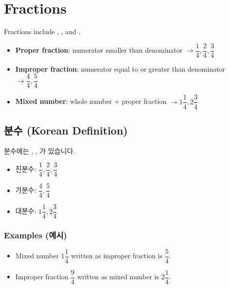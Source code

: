 \documentclass[12pt]{book}
\begin{document}
  \section{Fractions}
  
  Fractions include , , and .  
  
  \begin{itemize}
    \item \textbf{Proper fraction}: numerator smaller than denominator  
      $\rightarrow \dfrac{1}{4}, \dfrac{2}{4}, \dfrac{3}{4}$
    \item \textbf{Improper fraction}: numerator equal to or greater than denominator  
      $\rightarrow \dfrac{4}{4}, \dfrac{5}{4}$
    \item \textbf{Mixed number}: whole number + proper fraction  
      $\rightarrow 1 \dfrac{1}{4}, 2 \dfrac{3}{4}$
  \end{itemize}
  
  \subsection*{분수 (Korean Definition)}
  분수에는 , , 가 있습니다.  
  

  
  \begin{itemize}
    \item 진분수: $\dfrac{1}{4}, \dfrac{2}{4}, \dfrac{3}{4}$
    \item 가분수: $\dfrac{4}{4}, \dfrac{5}{4}$
    \item 대분수: $1 \dfrac{1}{4}, 2 \dfrac{3}{4}$
  \end{itemize}
  
  \subsubsection*{Examples (예시)}
  \begin{itemize}
    \item Mixed number $1 \dfrac{1}{4}$ written as improper fraction is $\dfrac{5}{4}$.
    \item Improper fraction $\dfrac{9}{4}$ written as mixed number is $2 \dfrac{1}{4}$.
  \end{itemize}
  
\end{document}

